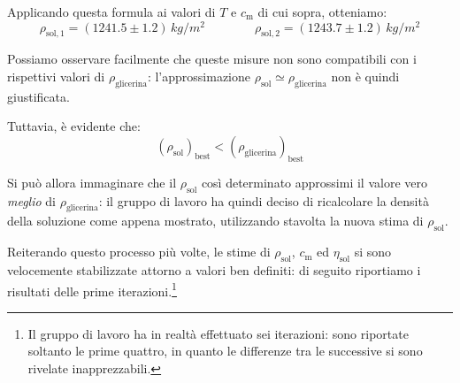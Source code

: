 \documentclass{article}
\begin{document}
Applicando questa formula ai valori di $T$ e $c_\text{m}$ di cui
sopra, otteniamo:
\[
  \rho_{\text{sol},1} = (1241.5\pm1.2)\,\unit{kg \per m^2}
  \qquad\qquad
  \rho_{\text{sol},2} = (1243.7\pm1.2)\,\unit{kg \per m^2}
\]

Possiamo osservare facilmente che queste misure non sono compatibili
con i rispettivi valori di $\rho_\text{glicerina}$: l'approssimazione
$\rho_\text{sol} \simeq \rho_\text{glicerina}$ non è quindi
giustificata.

Tuttavia, è evidente che:
\[(\rho_\text{sol})_\text{best} < (\rho_\text{glicerina})_\text{best}\]

Si può allora immaginare che il $\rho_\text{sol}$ così determinato
approssimi il valore vero \emph{meglio} di $\rho_\text{glicerina}$:
il gruppo di lavoro ha quindi deciso di ricalcolare la densità della
soluzione come appena mostrato, utilizzando stavolta la nuova stima
di $\rho_\text{sol}$.

\vspace{2mm}

Reiterando questo processo più volte, le stime di
$\rho_\text{sol}$, $c_\text{m}$ ed $\eta_\text{sol}$ si sono
velocemente stabilizzate attorno a valori ben definiti:
di seguito riportiamo i risultati delle prime iterazioni.\footnote{
  Il gruppo di lavoro ha in realtà effettuato sei iterazioni:
  sono riportate soltanto le prime quattro, in quanto le
  differenze tra le successive si sono rivelate inapprezzabili.
}
\end{document}
